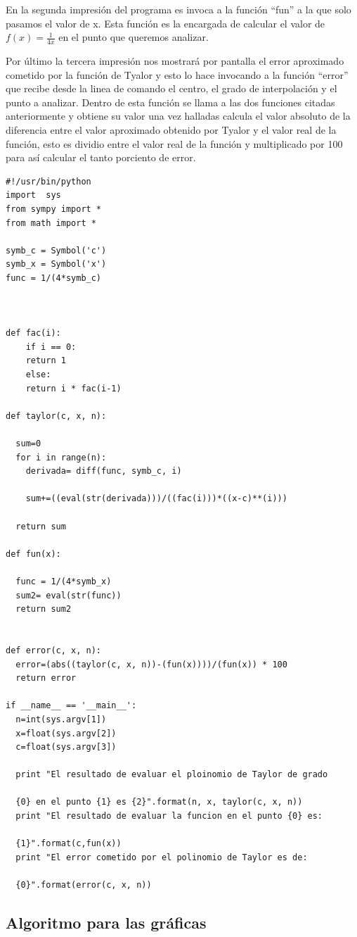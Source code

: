 \documentclass[a4paper,12pt]{article}
\begin{document}
En la segunda impresión del programa es invoca a la función ``fun'' a la que solo pasamos el valor de x. Esta función es la encargada de calcular 
el valor de $f(x)=\frac{1}{4x}$ en el punto que queremos analizar.
  
Por último la tercera impresión nos mostrará por pantalla el error aproximado cometido por la función de Tyalor y esto lo hace invocando a la función ``error'' que recibe
desde la linea de comando el centro, el grado de interpolación y el punto a analizar. Dentro de esta función se llama a las dos funciones citadas anteriormente y obtiene su valor
una vez halladas calcula el valor absoluto de la diferencia entre el valor aproximado obtenido por Tyalor y el valor real de la función, esto es dividio entre el valor real
de la función y multiplicado por 100 para así calcular el tanto porciento de error. 


\begin{verbatim}
#!/usr/bin/python
import  sys
from sympy import *
from math import *

symb_c = Symbol('c')
symb_x = Symbol('x')
func = 1/(4*symb_c)



def fac(i):
    if i == 0:
	return 1
    else:
	return i * fac(i-1)
	
def taylor(c, x, n):
  
  sum=0
  for i in range(n):
    derivada= diff(func, symb_c, i)

    sum+=((eval(str(derivada)))/((fac(i)))*((x-c)**(i)))
    
  return sum
  
def fun(x):
  
  func = 1/(4*symb_x)
  sum2= eval(str(func))
  return sum2
  
  
def error(c, x, n):
  error=(abs((taylor(c, x, n))-(fun(x))))/(fun(x)) * 100
  return error
    
if __name__ == '__main__':
  n=int(sys.argv[1])
  x=float(sys.argv[2])
  c=float(sys.argv[3])
    
  print "El resultado de evaluar el ploinomio de Taylor de grado
  
  {0} en el punto {1} es {2}".format(n, x, taylor(c, x, n))
  print "El resultado de evaluar la funcion en el punto {0} es: 
  
  {1}".format(c,fun(x))
  print "El error cometido por el polinomio de Taylor es de: 
  
  {0}".format(error(c, x, n))
\end{verbatim}
\subsection{Algoritmo para las gráficas}
\end{document}
